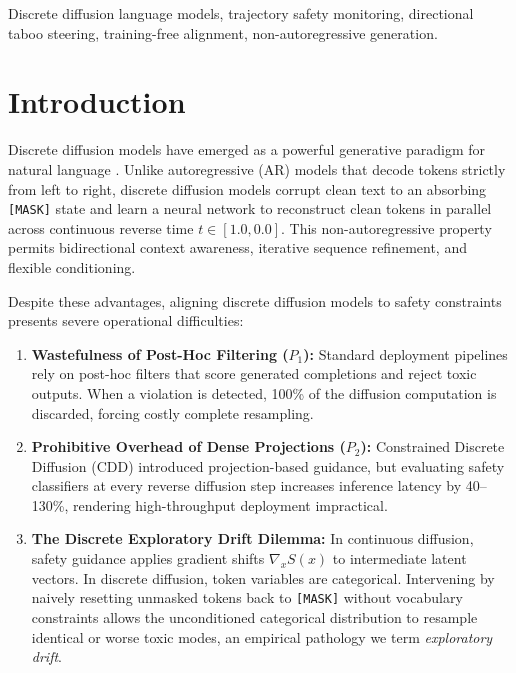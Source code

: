 \documentclass[conference]{IEEEtran}
\begin{document}
\begin{IEEEkeywords}
Discrete diffusion language models, trajectory safety monitoring, directional taboo steering, training-free alignment, non-autoregressive generation.
\end{IEEEkeywords}

\section{Introduction}
Discrete diffusion models have emerged as a powerful generative paradigm for natural language \cite{austin2021structured,sahoo2024simple}. Unlike autoregressive (AR) models that decode tokens strictly from left to right, discrete diffusion models corrupt clean text to an absorbing \texttt{[MASK]} state and learn a neural network to reconstruct clean tokens in parallel across continuous reverse time $t \in [1.0, 0.0]$. This non-autoregressive property permits bidirectional context awareness, iterative sequence refinement, and flexible conditioning.

Despite these advantages, aligning discrete diffusion models to safety constraints presents severe operational difficulties:
\begin{enumerate}
    \item \textbf{Wastefulness of Post-Hoc Filtering ($P_1$):} Standard deployment pipelines rely on post-hoc filters that score generated completions and reject toxic outputs. When a violation is detected, 100\% of the diffusion computation is discarded, forcing costly complete resampling.
    \item \textbf{Prohibitive Overhead of Dense Projections ($P_2$):} Constrained Discrete Diffusion (CDD) \cite{cardei2025cdd} introduced projection-based guidance, but evaluating safety classifiers at every reverse diffusion step increases inference latency by 40--130\%, rendering high-throughput deployment impractical.
    \item \textbf{The Discrete Exploratory Drift Dilemma:} In continuous diffusion, safety guidance applies gradient shifts $\nabla_x S(x)$ to intermediate latent vectors. In discrete diffusion, token variables are categorical. Intervening by naively resetting unmasked tokens back to \texttt{[MASK]} without vocabulary constraints allows the unconditioned categorical distribution to resample identical or worse toxic modes, an empirical pathology we term \textit{exploratory drift}.
\end{enumerate}
\end{document}
